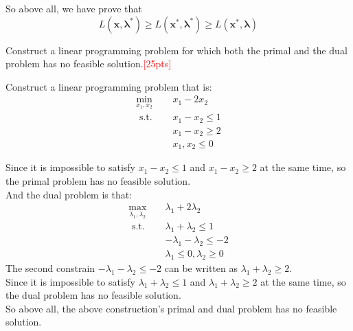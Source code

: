 \documentclass[10pt]{article}
\newenvironment{problem}[2][Problem]{\begin{trivlist}
\item[\hskip \labelsep {\bfseries #1}\hskip \labelsep {\bfseries #2.}]}{\end{trivlist}}
\begin{document}
So above all, we have prove that 
$$L(\bm{x}, \bm{\lambda}^*) \geq L(\bm{x}^*, \bm{\lambda}^*) \geq L(\bm{x}^*, \bm{\lambda})$$

\newpage


\begin{problem}{4}
    Construct a linear programming problem for which both the primal and the dual problem has no feasible solution.\textcolor{red}{[25pts]}

Construct a linear programming problem that is:\\
\begin{equation}
\begin{aligned}
\min_{x_1,x_2} \quad & x_1-2x_2 \\
\text { s.t. } \quad & x_1 - x_2 \leq 1 \\
& x_1 - x_2 \geq 2 \\
& x_1,x_2 \leq 0
\end{aligned}
\end{equation}

Since it is impossible to satisfy $x_1 - x_2 \leq 1$ and $x_1 - x_2 \geq 2$ at the same time, so the primal problem has no feasible solution.\\
And the dual problem is that:\\
\begin{equation}
\begin{aligned}
\max_{\lambda_1,\lambda_2} \quad & \lambda_1 + 2\lambda_2 \\
\text { s.t. } \quad & \lambda_1 + \lambda_2 \leq 1 \\
& -\lambda_1 - \lambda_2 \leq -2 \\
& \lambda_1\leq 0,\lambda_2 \geq 0
\end{aligned}
\end{equation}
The second constrain $-\lambda_1 - \lambda_2 \leq -2$ can be written as $\lambda_1 + \lambda_2 \geq 2$.\\
Since it is impossible to satisfy $\lambda_1 + \lambda_2 \leq 1$ and $\lambda_1 + \lambda_2 \geq 2$ at the same time, so the dual problem has no feasible solution.\\

So above all, the above construction's primal and dual problem has no feasible solution.\\

\end{problem}
\end{document}

